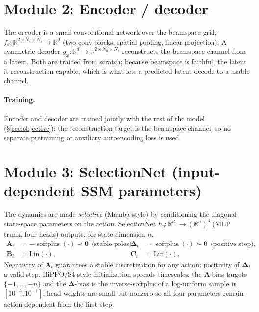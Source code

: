 \documentclass[11pt]{article}
\newcommand{\R}{\mathbb{R}}
\newcommand{\softplus}{\operatorname{softplus}}
\begin{document}
\section{Module 2: Encoder / decoder}\label{sec:encoder}

The encoder is a small convolutional network over the beamspace grid,
$f_\theta:\R^{2\times N_a\times N_s}\!\to\R^{d}$ (two conv blocks, spatial pooling, linear
projection). A symmetric decoder $g_\omega:\R^{d}\!\to\R^{2\times N_a\times N_s}$ reconstructs the
beamspace channel from a latent. Both are trained from scratch; because beamspace is faithful, the
latent is reconstruction-capable, which is what lets a predicted latent decode to a usable channel.

\paragraph{Training.} Encoder and decoder are trained jointly with the rest of the model
(\S\ref{sec:objective}); the reconstruction target is the beamspace channel, so no separate
pretraining or auxiliary autoencoding loss is used.

\section{Module 3: SelectionNet (input-dependent SSM parameters)}\label{sec:selection}

The dynamics are made \emph{selective} (Mamba-style) by conditioning the diagonal state-space
parameters on the action. SelectionNet $h_\eta:\R^{d_a}\!\to(\R^{n})^4$ (MLP trunk, four heads)
outputs, for state dimension $n$,
\begin{align}
\mathbf{A}_t &= -\softplus(\cdot)\prec\mathbf 0 \ \ \text{(stable poles)}, &
\bm{\Delta}_t &= \softplus(\cdot)\succ\mathbf 0 \ \ \text{(positive step)}, \\
\mathbf{B}_t &= \mathrm{Lin}(\cdot), & \mathbf{C}_t &= \mathrm{Lin}(\cdot).
\end{align}
Negativity of $\mathbf A_t$ guarantees a stable discretization for any action; positivity of
$\bm\Delta_t$ a valid step. HiPPO/S4-style initialization spreads timescales: the $\mathbf A$-bias
targets $\{-1,\dots,-n\}$ and the $\bm\Delta$-bias is the inverse-softplus of a log-uniform sample in
$[10^{-3},10^{-1}]$; head weights are small but nonzero so all four parameters remain action-dependent
from the first step.
\end{document}
